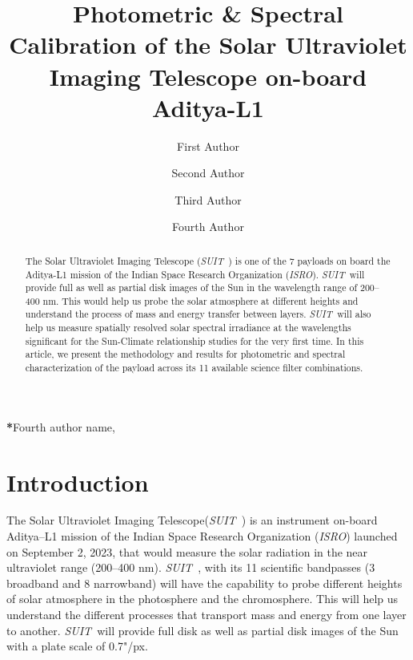 \documentclass[12pt]{spieman}  %
\title{Photometric \& Spectral Calibration of the Solar Ultraviolet Imaging Telescope on-board Aditya-L1}
\author[a]{First Author}
\author[a]{Second Author}
\author[b]{Third Author}
\author[a,b,*]{Fourth Author}
\affil[a]{University Name, Faculty Group, Department, Street Address, City, Country, Postal Code}
\affil[b]{Company Name, Street Address, City, Country, Postal Code}
\newcommand{\isro}{{\it ISRO}}
\newcommand{\suit}{{\it SUIT~}}
\begin{document}
 
\maketitle

\begin{abstract}
The Solar Ultraviolet Imaging Telescope (\suit) is one of the 7 payloads on board the Aditya-L1 mission of the Indian Space Research Organization (\isro). \suit will provide full as well as partial disk images of the Sun in the wavelength range of 200{--}400 nm. This would help us probe the solar atmosphere at different heights and understand the process of mass and energy transfer between layers. \suit will also help us measure spatially resolved solar spectral irradiance at the wavelengths significant for the Sun-Climate relationship studies for the very first time. In this article, we present the methodology and results for photometric and spectral characterization of the payload across its 11 available science filter combinations.  
\end{abstract}


{\noindent \footnotesize\textbf{*}Fourth author name,   }


\section{Introduction}\label{sec:intro}

The Solar Ultraviolet Imaging Telescope(\suit) \cite{ghosh16,article} is an instrument on-board Aditya{--}L1 mission \cite{adityal1,aditya} of the Indian Space Research Organization (\isro) launched on September 2, 2023, that would measure the solar radiation in the near ultraviolet range (200{--}400 nm). \suit, with its 11 scientific bandpasses (3 broadband and 8 narrowband) will have the capability to probe different heights of solar atmosphere in the photosphere and the chromosphere. This will help us understand the different processes that transport mass and energy from one layer to another. \suit will provide full disk as well as partial disk images of the Sun with a plate scale of 0.7"/px.
\end{document}
